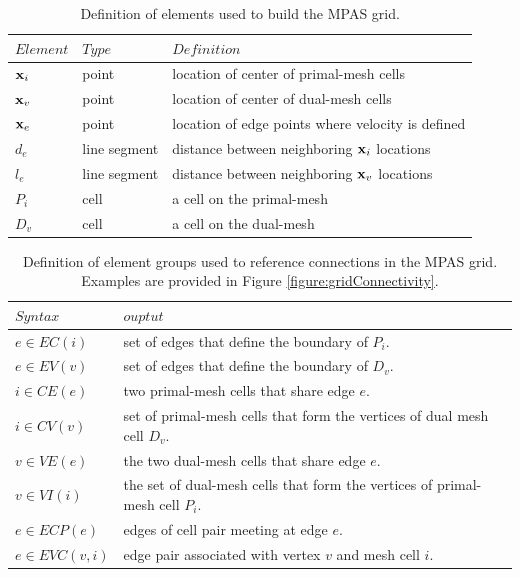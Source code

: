 \begin{table}[t]
\caption{Definition of elements used to build the MPAS grid.}
\label{table:variablePosition}
\begin{center}
\begin{tabular}{lll}
\hline\hline
$Element$ & $Type$ & $Definition$\\
\hline
 ${\bf x}_i$   & point             & location of center of primal-mesh cells \\
 ${\bf x}_v$  &  point            & location of center of dual-mesh cells \\
 ${\bf x}_e$  & point             & location of edge points where velocity is defined \\
 $d_{e}$       & line segment & distance between neighboring ${\bf x}_i$ locations \\
 $l_{e}$       & line segment & distance between neighboring ${\bf x}_v$ locations \\
 $P_i$         & cell                 & a cell on the primal-mesh \\
 $D_v$        & cell                 & a cell on the dual-mesh \\
\hline
\end{tabular}
\end{center}
\end{table}
%
\begin{table}[t]
\caption{Definition of element groups used to reference connections in the MPAS grid. Examples are provided in Figure \ref{figure:gridConnectivity}.}
\label{table:gridConnectivity}
\begin{center}
\begin{tabular}{lll}
\hline\hline
$Syntax$ & $ouptut$\\
\hline
 $e \in EC(i) $   & set of edges that define the boundary of $P_i$. \\
 $e \in EV(v) $     & set of edges that define the boundary of $D_v$. \\
 $i \in CE(e) $                 & two primal-mesh cells that share edge $e$. \\
 $i \in CV(v) $  &  set of primal-mesh cells that form the vertices of dual mesh cell $D_v$. \\
 $v\in VE(e) $  & the two dual-mesh cells that share edge $e$. \\
 $v \in VI(i) $   & the set of dual-mesh cells that form the vertices of primal-mesh cell $P_i$. \\
 $e \in ECP(e)$ & edges of cell pair meeting at edge $e$. \\
 $e \in EVC(v,i)$ & edge pair associated with vertex $v$ and mesh cell $i$. \\
\hline
\end{tabular}
\end{center}
\end{table}
%

